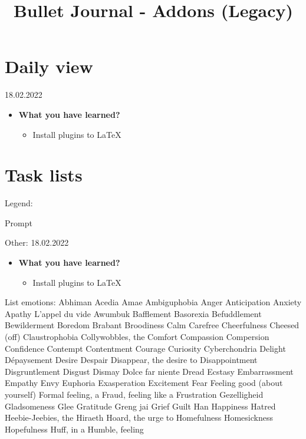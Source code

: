 \documentclass[a4paper]{article}
\title{Bullet Journal - Addons (Legacy)}
\begin{document}
\maketitle
\tableofcontents
\newpage
\section{Daily view}
18.02.2022
\begin{itemize}
	\item \textbf{What you have learned?}
    \begin{itemize}
        \item Install plugins to LaTeX
    \end{itemize}
\end{itemize}

\newpage
\section{Task lists}
Legend:
\begin{itemize}
	 [+] Prompt 
\end{itemize}
Other:
18.02.2022
\begin{itemize}
	\item \textbf{What you have learned?}
    \begin{itemize}
        \item Install plugins to LaTeX
    \end{itemize}
\end{itemize}
\newpage
List emotions:
	 Abhiman
	 Acedia
	 Amae
	 Ambiguphobia
	 Anger
	 Anticipation
	 Anxiety
	 Apathy
	 L’appel du vide
	 Awumbuk
	 Bafflement
	 Basorexia
	 Befuddlement
	 Bewilderment
	 Boredom
	 Brabant
	 Broodiness
	 Calm
	 Carefree
	 Cheerfulness
	 Cheesed (off)
	 Claustrophobia
	 Collywobbles, the
	 Comfort
	 Compassion
	 Compersion
	 Confidence
	 Contempt
	 Contentment
	 Courage
	 Curiosity
	 Cyberchondria
	 Delight
	 Dépaysement
	 Desire
	 Despair
	 Disappear, the desire to
	 Disappointment
	 Disgruntlement
	 Disgust
	 Dismay
	 Dolce far niente
	 Dread
	 Ecstasy
	 Embarrassment
	 Empathy
	 Envy
	 Euphoria
	 Exasperation
	 Excitement
	 Fear
	 Feeling good (about yourself)
	 Formal feeling, a
	 Fraud, feeling like a
	 Frustration
	 Gezelligheid
	 Gladsomeness
	 Glee
	 Gratitude
	 Greng jai
	 Grief
	 Guilt
	 Han
	 Happiness
	 Hatred
	 Heebie-Jeebies, the
	 Hiraeth
	 Hoard, the urge to
	 Homefulness
	 Homesickness
	 Hopefulness
	 Huff, in a
	 Humble, feeling
\end{document}
